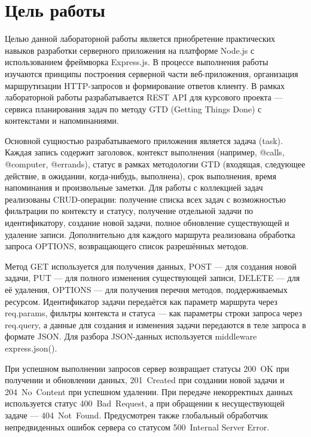 \documentclass{stp}
\begin{document}

\section{Цель работы}

Целью данной лабораторной работы является приобретение практических
навыков разработки серверного приложения на платформе Node.js с
использованием фреймворка Express.js. В процессе выполнения работы
изучаются принципы построения серверной части веб-приложения,
организация маршрутизации HTTP-запросов и формирование ответов
клиенту. В рамках лабораторной работы разрабатывается REST API для
курсового проекта — сервиса планирования задач по методу GTD (Getting
Things Done) с контекстами и напоминаниями.

Основной сущностью разрабатываемого приложения является задача
(task). Каждая запись содержит заголовок, контекст выполнения
(например, @calls, @computer, @errands),
статус в рамках методологии GTD (входящая, следующее действие, в
ожидании, когда-нибудь, выполнена), срок выполнения, время
напоминания и произвольные заметки. Для работы с коллекцией задач
реализованы CRUD-операции: получение списка всех задач с возможностью
фильтрации по контексту и статусу, получение отдельной задачи по
идентификатору, создание новой задачи, полное обновление существующей
и удаление записи. Дополнительно для каждого маршрута реализована
обработка запроса OPTIONS, возвращающего список разрешённых методов.

Метод GET используется для получения данных, POST — для создания
новой задачи, PUT — для полного изменения существующей записи, DELETE
— для её удаления, OPTIONS — для получения перечня методов,
поддерживаемых ресурсом. Идентификатор задачи передаётся как параметр
маршрута через req.params, фильтры контекста и статуса — как
параметры строки запроса через req.query, а данные для
создания и изменения задачи передаются в теле запроса в формате JSON.
Для разбора JSON-данных используется middleware express.json().

При успешном выполнении запросов сервер возвращает статусы 200~OK при
получении и обновлении данных, 201~Created при создании новой задачи
и 204~No~Content при успешном удалении. При передаче некорректных
данных используется статус 400~Bad~Request, а при обращении к
несуществующей задаче — 404~Not~Found. Предусмотрен также глобальный
обработчик непредвиденных ошибок сервера со статусом 500~Internal
Server Error.
\end{document}
